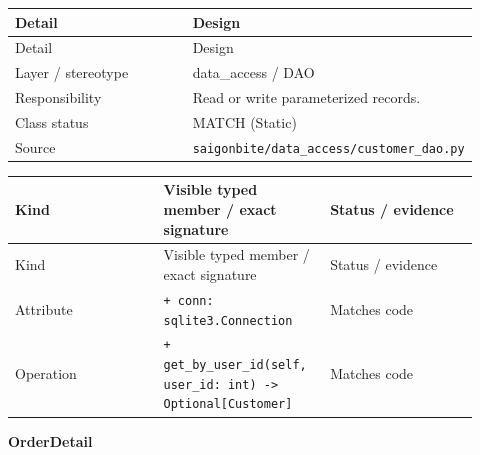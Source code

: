 \begin{longtable}{>{\raggedright\arraybackslash}p{0.4600\linewidth}>{\raggedright\arraybackslash}p{0.4600\linewidth}}
Detail & Design \\
\hline\endfirsthead
Detail & Design \\
\hline\endhead
Layer / stereotype & data\_access / \guillemotleft{}DAO\guillemotright{} \\
Responsibility & Read or write parameterized records. \\
Class status & MATCH (Static) \\
Source & \texttt{saigonbite/\allowbreak{}data\_\allowbreak{}access/\allowbreak{}customer\_\allowbreak{}dao.\allowbreak{}py} \\
\end{longtable}
\begin{longtable}{>{\raggedright\arraybackslash}p{0.3067\linewidth}>{\raggedright\arraybackslash}p{0.3067\linewidth}>{\raggedright\arraybackslash}p{0.3067\linewidth}}
Kind & Visible typed member / exact signature & Status / evidence \\
\hline\endfirsthead
Kind & Visible typed member / exact signature & Status / evidence \\
\hline\endhead
Attribute & \texttt{+ conn: sqlite3.\allowbreak{}Connection} & Matches code \\
Operation & \texttt{+ get\_\allowbreak{}by\_\allowbreak{}user\_\allowbreak{}id(self, user\_\allowbreak{}id: int) -\textgreater{} Optional[Customer]} & Matches code \\
\end{longtable}
\textbf{OrderDetail}

